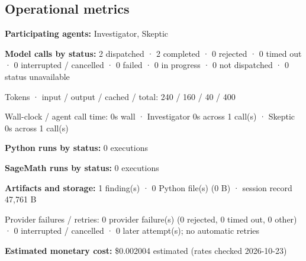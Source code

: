 \documentclass[11pt]{article}
\begin{document}
\subsection{Operational metrics}
\textbf{Participating agents:} Investigator, Skeptic\par
\textbf{Model calls by status:} 2 dispatched · 2 completed · 0 rejected · 0 timed out · 0 interrupted / cancelled · 0 failed · 0 in progress · 0 not dispatched · 0 status unavailable\par
Tokens · input / output / cached / total: 240 / 160 / 40 / 400\par
Wall-clock / agent call time: 0s wall · Investigator 0s across 1 call(s) · Skeptic 0s across 1 call(s)\par
\textbf{Python runs by status:} 0 executions\par
\textbf{SageMath runs by status:} 0 executions\par
\textbf{Artifacts and storage:} 1 finding(s) · 0 Python file(s) (0 B) · session record 47,761 B\par
Provider failures / retries: 0 provider failure(s) (0 rejected, 0 timed out, 0 other) · 0 interrupted / cancelled · 0 later attempt(s); no automatic retries\par
\textbf{Estimated monetary cost:} \$0.002004 estimated (rates checked 2026-10-23)\par
\end{document}
